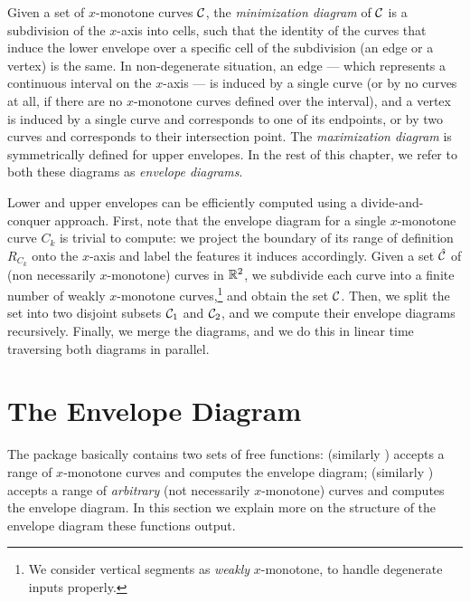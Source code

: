 Given a set of $x$-monotone curves ${\cal C}$, the {\em minimization
diagram} of ${\cal C}$ is a subdivision of the $x$-axis into cells,
such that the identity of the curves that induce the lower envelope
over a specific cell of the subdivision (an edge or a vertex) is the
same. In non-degenerate situation, an edge --- which represents a
continuous interval on the $x$-axis --- is induced by a single
curve (or by no curves at all, if there are no $x$-monotone curves
defined over the interval), and a vertex is induced by a single curve
and corresponds to one of its endpoints, or by two curves and
corresponds to their intersection point.
The {\em maximization diagram} is symmetrically defined for upper envelopes.
In the rest of this chapter, we refer to both these diagrams as
{\em envelope diagrams}.

Lower and upper envelopes can be efficiently computed using a
divide-and-conquer approach. First, note that the envelope diagram for
a single $x$-monotone curve $C_k$ is trivial to compute: we project
the boundary of its range of definition $R_{C_k}$ onto the $x$-axis
and label the features it induces accordingly. Given a set
$\hat{{\cal C}}$ of (non necessarily $x$-monotone) curves in $\mathbb{R}^2$,
we subdivide each curve into a finite number of weakly $x$-monotone 
curves,\footnote{We consider vertical segments as {\em weakly} 
$x$-monotone, to handle degenerate inputs properly.} and obtain the set
${\cal C}$. Then, we split the set into two disjoint subsets ${\cal C}_1$ 
and ${\cal C}_2$, and we compute their envelope diagrams recursively. 
Finally, we merge the diagrams, and we do this in linear time 
traversing both diagrams in parallel.

\section{The Envelope Diagram}
\label{env2_sec:env_diag}

The package basically contains two sets of free functions:
 (similarly
 ) accepts a range of $x$-monotone
curves and computes the envelope diagram; 
 (similarly
) accepts a range of {\em arbitrary} (not
necessarily $x$-monotone) curves and computes the envelope diagram.
In this section we explain more on the structure of the envelope
diagram these functions output.

